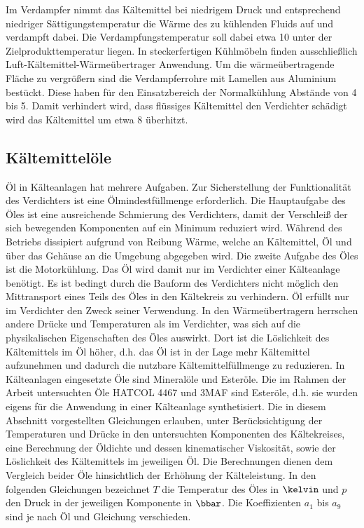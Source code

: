 Im Verdampfer nimmt das Kältemittel bei niedrigem Druck und entsprechend niedriger Sättigungstemperatur die Wärme des zu kühlenden Fluids auf und verdampft dabei. Die Verdampfungstemperatur soll dabei etwa \unit{10}{\kelvin} unter der Zielprodukttemperatur liegen. In steckerfertigen Kühlmöbeln finden ausschließlich Luft-Kältemittel-Wärmeübertrager Anwendung. Um die wärmeübertragende Fläche zu vergrößern sind die Verdampferrohre mit Lamellen aus Aluminium bestückt. Diese haben für den Einsatzbereich der Normalkühlung Abstände von \unit{4}{\milli\metre} bis \unit{5}{\milli\metre}. Damit verhindert wird, dass flüssiges Kältemittel den Verdichter schädigt wird das Kältemittel um etwa \unit{8}{\kelvin} überhitzt.


\subsection{Kältemittelöle}
\label{subsec:Kältemittelöle}

Öl in Kälteanlagen hat mehrere Aufgaben. Zur Sicherstellung der Funktionalität des Verdichters ist eine Ölmindestfüllmenge erforderlich. Die Hauptaufgabe des Öles ist eine ausreichende Schmierung des Verdichters, damit der Verschleiß der sich bewegenden Komponenten auf ein Minimum reduziert wird.  Während des Betriebs dissipiert aufgrund von Reibung Wärme, welche an Kältemittel, Öl und über das Gehäuse an die Umgebung abgegeben wird. \newline
Die zweite Aufgabe des Öles ist die Motorkühlung. Das Öl wird damit nur im Verdichter einer Kälteanlage benötigt. Es ist bedingt durch die Bauform des Verdichters nicht möglich den Mittransport eines Teils des Öles in den Kältekreis zu verhindern. Öl erfüllt nur im Verdichter den Zweck seiner Verwendung. In den Wärmeübertragern herrschen andere Drücke und Temperaturen als im Verdichter, was sich auf die physikalischen Eigenschaften des Öles auswirkt. Dort ist die Löslichkeit des Kältemittels im Öl höher, d.h. das Öl ist in der Lage mehr Kältemittel aufzunehmen und dadurch die nutzbare Kältemittelfüllmenge zu reduzieren. \newline
In Kälteanlagen eingesetzte Öle sind Mineralöle und Esteröle. Die im Rahmen der Arbeit untersuchten Öle HATCOL 4467 und 3MAF sind Esteröle, d.h. sie wurden eigens für die Anwendung in einer Kälteanlage synthetisiert\cite{ChemturaCorporation.2017}\cite{LubrizolCorporation.2015}. 
Die in diesem Abschnitt vorgestellten Gleichungen erlauben, unter Berücksichtigung der  Temperaturen und Drücke in den untersuchten Komponenten des Kältekreises, eine Berechnung der Öldichte und dessen kinematischer Viskosität, sowie der Löslichkeit des Kältemittels im jeweiligen Öl\cite{EmersonClimateTechnologies.b}. Die Berechnungen dienen dem Vergleich beider Öle hinsichtlich der  Erhöhung der Kälteleistung. In den folgenden Gleichungen bezeichnet $T$ die Temperatur des Öles in $\kelvin$ und $p$ den Druck in der jeweiligen Komponente in $\bbar$. Die Koeffizienten $a_1$ bis $a_9$ sind je nach Öl und Gleichung verschieden.

